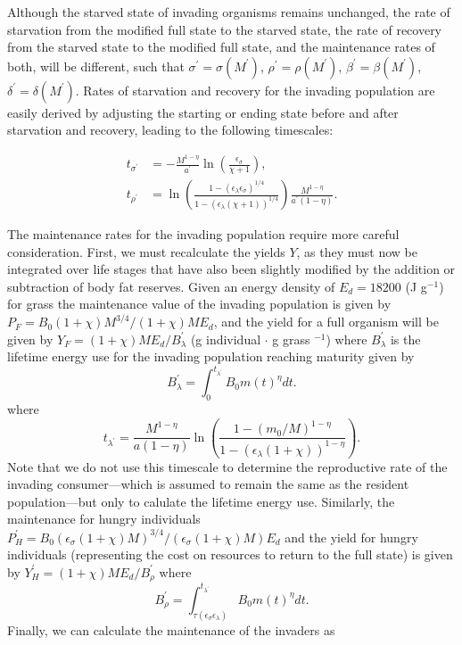 \documentclass[twocolumn,preprintnumbers,amsmath,amssymb,superscriptaddress]{revtex4}
\begin{document}
Although the starved state of invading organisms remains unchanged, the rate of starvation from the modified full state to the starved state, the rate of recovery from the starved state to the modified full state, and the maintenance rates of both, will be different, such that $\sigma^\prime = \sigma(M^\prime)$, $\rho^\prime = \rho(M^\prime)$, $\beta^\prime = \beta(M^\prime)$, $\delta^\prime = \delta(M^\prime)$.
Rates of starvation and recovery for the invading population are easily derived by adjusting the starting or ending state before and after starvation and recovery, leading to the following timescales:

\begin{align}
t_{\sigma^\prime} &= -\frac{M^{1-\eta}}{a^{\prime}}\ln \left(\frac{\epsilon_\sigma}{\chi +1}\right), \\ \nonumber
t_{\rho^\prime} &= \ln \left(\frac{1-(\epsilon_\lambda \epsilon_\sigma)^{1/4}}{1-( \epsilon_\lambda(\chi +1))^{1/4}}\right)\frac{M^{1-\eta}}{a^{\prime}\left(1-\eta\right)}.
\end{align}


The maintenance rates for the invading population require more careful consideration.
First, we must recalculate the yields $Y$, as they must now be integrated over life stages that have also been slightly modified by the addition or subtraction of body fat reserves.
Given an energy density of $E_{d}=18200$ (J g$^{-1}$) for grass \citep{estermann} the maintenance value of the invading population is given by $P_{F}=B_{0}(1+\chi)M^{3/4}/(1+\chi)ME_{d}$, and the yield for a full organism will be given by $Y_{F}=(1+\chi)ME_{d}/B^{\prime}_{\lambda}$ (g individual $\cdot$ g grass $^{-1}$) where $B^{\prime}_{\lambda}$ is the lifetime energy use for the invading population reaching maturity given by
\begin{equation}
B^{\prime}_{\lambda}=\int_{0}^{t_{\lambda^\prime}}B_{0}m\left(t\right)^{\eta}dt.
\end{equation}
where
\begin{equation}
t_{\lambda^\prime} = \frac{M^{1-\eta} }{a(1-\eta)}\ln \left(\frac{1-(m_0/M)^{1-\eta}}{1-(\epsilon_\lambda (1+\chi))^{1-\eta}} \right).
\end{equation}
Note that we do not use this timescale to determine the reproductive rate of the invading consumer---which is assumed to remain the same as the resident population---but only to calulate the lifetime energy use.
Similarly, the maintenance for hungry individuals $P^\prime_{H}=B_{0}(\epsilon_{\sigma}(1+\chi)M)^{3/4}/(\epsilon_{\sigma}(1+\chi)M)E_{d}$ and the yield for hungry individuals (representing the cost on resources to return to the full state) is given by $Y^\prime_{H}=(1+\chi)ME_{d}/B^{\prime}_{\rho}$ where
\begin{equation}
B^{\prime}_{\rho}=\int_{\tau\left(\epsilon_{\sigma}\epsilon_{\lambda}\right)}^{t_{\lambda^\prime}}B_{0}m\left(t\right)^{\eta}dt.
\end{equation}
Finally, we can calculate the maintenance of the invaders as
\end{document}
